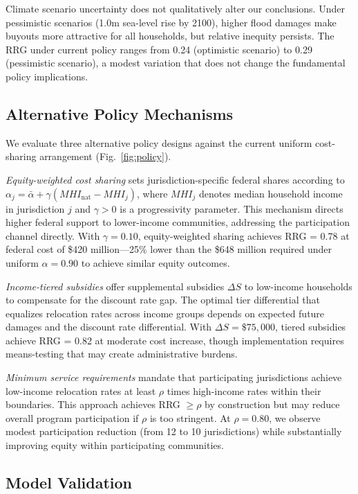 \documentclass[11pt,letterpaper]{article}
\theoremstyle{definition}
\begin{document}
Climate scenario uncertainty does not qualitatively alter our conclusions. Under pessimistic scenarios (1.0m sea-level rise by 2100), higher flood damages make buyouts more attractive for all households, but relative inequity persists. The RRG under current policy ranges from 0.24 (optimistic scenario) to 0.29 (pessimistic scenario), a modest variation that does not change the fundamental policy implications.

\subsection{Alternative Policy Mechanisms}

We evaluate three alternative policy designs against the current uniform cost-sharing arrangement (Fig.~\ref{fig:policy}).

\textit{Equity-weighted cost sharing} sets jurisdiction-specific federal shares according to $\alpha_j = \bar{\alpha} + \gamma(MHI_{\text{nat}} - MHI_j)$, where $MHI_j$ denotes median household income in jurisdiction $j$ and $\gamma > 0$ is a progressivity parameter. This mechanism directs higher federal support to lower-income communities, addressing the participation channel directly. With $\gamma = 0.10$, equity-weighted sharing achieves RRG = 0.78 at federal cost of \$420 million---25\% lower than the \$648 million required under uniform $\alpha = 0.90$ to achieve similar equity outcomes.

\textit{Income-tiered subsidies} offer supplemental subsidies $\Delta S$ to low-income households to compensate for the discount rate gap. The optimal tier differential that equalizes relocation rates across income groups depends on expected future damages and the discount rate differential. With $\Delta S = \$75,000$, tiered subsidies achieve RRG = 0.82 at moderate cost increase, though implementation requires means-testing that may create administrative burdens.

\textit{Minimum service requirements} mandate that participating jurisdictions achieve low-income relocation rates at least $\rho$ times high-income rates within their boundaries. This approach achieves RRG $\geq \rho$ by construction but may reduce overall program participation if $\rho$ is too stringent. At $\rho = 0.80$, we observe modest participation reduction (from 12 to 10 jurisdictions) while substantially improving equity within participating communities.

\subsection{Model Validation}
\end{document}
